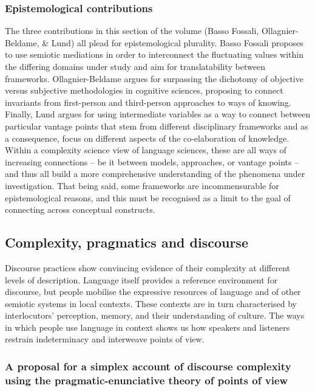\documentclass[output=paper]{langscibook}
\begin{document}
\subsubsection{Epistemological contributions}
\begin{sloppypar}
The three contributions in this section of the volume  (Basso Fossali, Ollagnier-Beldame, \& Lund) all plead for epistemological plurality. Basso Fossali proposes to use semiotic mediations in order to interconnect the fluctuating values within the differing domains under study and aim for translatability between frameworks. Ollagnier-Beldame argues for surpassing the dichotomy of objective versus subjective methodologies in cognitive sciences, proposing to connect invariants from first-person and third-person approaches to ways of knowing. Finally, Lund argues for using intermediate variables as a way to connect between particular vantage points that stem from different disciplinary frameworks and as a consequence, focus on different aspects of the co-elaboration of knowledge. Within a complexity science view of language sciences, these are all ways of increasing connections – be it between models, approaches, or vantage points – and thus all build a more comprehensive understanding of the phenomena under investigation. That being said, some frameworks are incommensurable for epistemological reasons, and this must be recognised as a limit to the goal of connecting across conceptual constructs.
\end{sloppypar}
\subsection{Complexity, pragmatics and discourse} 

Discourse practices show convincing evidence of their complexity at different levels of description. Language itself provides a reference environment for discourse, but people mobilise the expressive resources of language and of other semiotic systems in local contexts. These contexts are in turn characterised by interlocutors’ perception, memory, and their understanding of culture. The ways in which people use language in context shows us how speakers and listeners restrain indeterminacy and interweave points of view. 

\subsubsection{A proposal for a simplex account of discourse complexity using the pragmatic-enunciative theory of points of view}
\end{document}
